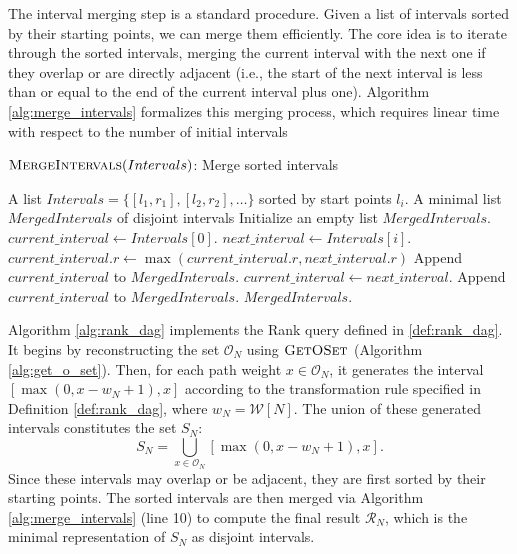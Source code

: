 The interval merging step is a standard procedure. Given a list of intervals sorted by their starting points, we can merge them efficiently. The core idea is to iterate through the sorted intervals, merging the current interval with the next one if they overlap or are directly adjacent (i.e., the start of the next interval is less than or equal to the end of the current interval plus one). Algorithm \ref{alg:merge_intervals} formalizes this merging process, which requires linear time with respect to the number of initial intervals
\begin{algorithm}[htbp]
    \caption{$\textsc{MergeIntervals}(Intervals)$: Merge sorted intervals}
    \label{alg:merge_intervals}
    \small
    \begin{algorithmic}[1]
        \Require A list $Intervals = \{[l_1, r_1], [l_2, r_2], \dots\}$ sorted by start points $l_i$.
        \Ensure A minimal list $MergedIntervals$ of disjoint intervals
        \State Initialize an empty list $MergedIntervals$.
        \State $current\_interval \gets Intervals[0]$.
        \State $next\_interval \gets Intervals[i]$.
        \State $current\_interval.r \gets \max(current\_interval.r, next\_interval.r)$
        \Else
        \State Append $current\_interval$ to $MergedIntervals$.
        \State $current\_interval \gets next\_interval$.
        \EndIf
        \EndFor
        \State Append $current\_interval$ to $MergedIntervals$.
        \EndIf
        \State \Return $MergedIntervals$.
    \end{algorithmic}
\end{algorithm}



Algorithm \ref{alg:rank_dag} implements the Rank query defined in \ref{def:rank_dag}. It begins by reconstructing the set $\mathcal{O}_N$ using $\textsc{GetOSet}$ (Algorithm \ref{alg:get_o_set}). Then, for each path weight $x \in \mathcal{O}_N$, it generates the interval $[\max(0, x - w_N + 1), x]$ according to the transformation rule specified in Definition \ref{def:rank_dag}, where $w_N = \mathcal{W}[N]$. The union of these generated intervals constitutes the set $S_N$:
\[ S_N = \bigcup_{x \in \mathcal{O}_N} [ \max(0, x - w_N + 1), x ]. \]
Since these intervals may overlap or be adjacent, they are first sorted by their starting points. The sorted intervals are then merged via Algorithm \ref{alg:merge_intervals} (line 10) to compute the final result $\mathcal{R}_N$, which is the minimal representation of $S_N$ as disjoint intervals.

